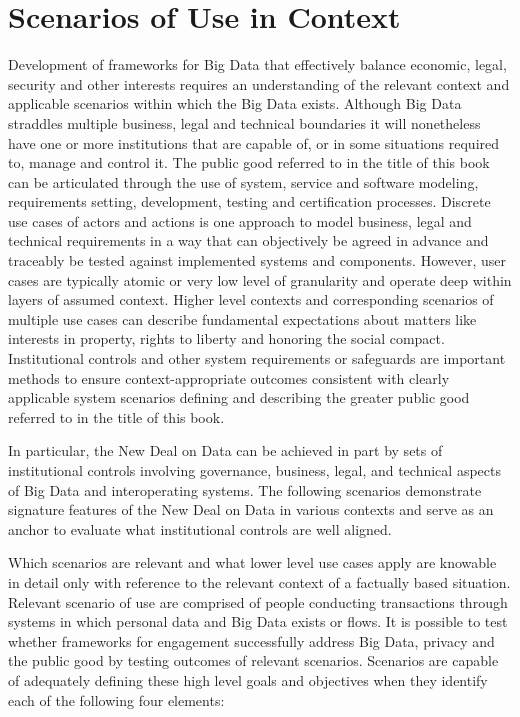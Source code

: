  \section{Scenarios of Use in Context }

Development of frameworks for Big Data that effectively balance economic, legal, security and other interests requires an understanding of the relevant context and applicable  scenarios within which the Big Data exists. Although Big Data straddles multiple business, legal and technical boundaries it will nonetheless have one or more institutions that are capable of, or in some situations required to, manage and control it.  The public good referred to in the title of this book can be articulated through the use of system, service and software modeling, requirements setting, development, testing and certification processes.  Discrete use cases of actors and actions is one approach to model business, legal and technical requirements in a way that can objectively be agreed in advance and traceably be tested against implemented systems and components. However, user cases are typically atomic or very low level of granularity and operate deep within layers of assumed context.  Higher level contexts and corresponding scenarios of multiple use cases can describe fundamental expectations about matters like interests in property, rights to liberty and honoring the social compact.  Institutional controls and other system requirements or safeguards are important methods to ensure context-appropriate outcomes consistent with clearly applicable system scenarios defining and describing the greater public good referred to in the title of this book.  


In particular, the New Deal on Data can be achieved in part by sets of institutional controls involving governance, business, legal, and technical aspects of Big Data and interoperating systems.  The following scenarios demonstrate signature features of the New Deal on Data in various contexts and serve as an anchor to evaluate what institutional controls are well aligned. 

Which scenarios are relevant and what lower level use cases apply are knowable in detail only with reference to the relevant context of a factually based situation.  Relevant scenario of use are comprised of people conducting transactions through systems in which personal data and Big Data exists or flows. It is possible to test whether frameworks for engagement successfully address Big Data, privacy and the public good by testing outcomes of relevant scenarios.  Scenarios are capable of adequately defining these high level goals and objectives when they identify each of the following four elements:  

